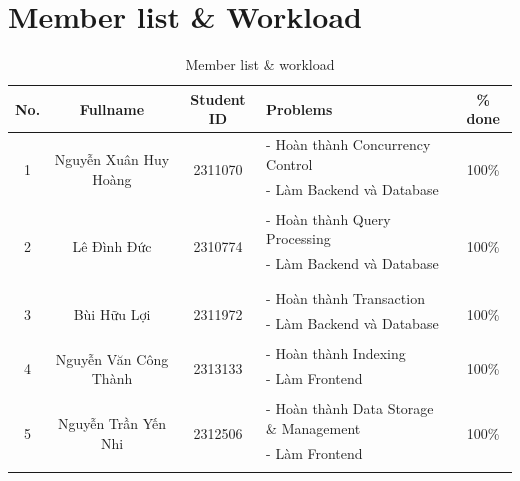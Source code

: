 
\section*{Member list \& Workload}
\begin{center}
\begin{table}[h]
\centering
\begin{tabular}{|c|c|c|p{6cm}|c|}
\hline
\textbf{No.} & \textbf{Fullname} & \textbf{Student ID} & \textbf{Problems} & \textbf{\% done}\\
\hline 
\multirow{3}{*}{1} & \multirow{3}{*}{Nguyễn Xuân Huy Hoàng} & \multirow{3}{*}{2311070} & 
- Hoàn thành Concurrency Control & \multirow{3}{*}{100\%}\\
 & &  & - Làm Backend và Database  &\\
 & &  & &\\
\hline 
\multirow{4}{*}{2} & \multirow{4}{*}{Lê Đình Đức} & \multirow{4}{*}{2310774} & 
- Hoàn thành Query Processing & \multirow{4}{*}{100\%}\\
 & &  & - Làm Backend và Database  &\\
 & &  & &\\
 & &  & &\\
\hline
\multirow{3}{*}{3} & \multirow{3}{*}{Bùi Hữu Lợi} & \multirow{3}{*}{2311972} & 
- Hoàn thành Transaction  & \multirow{3}{*}{100\%}\\
 & &  & - Làm Backend và Database  &\\
 & &  & &\\
\hline
\multirow{3}{*}{4} & \multirow{3}{*}{Nguyễn Văn Công Thành} & \multirow{3}{*}{2313133} & 
- Hoàn thành Indexing & \multirow{3}{*}{100\%}\\
 & &  & - Làm Frontend &\\
 & &  & & \\
\hline
\multirow{3}{*}{5} & \multirow{3}{*}{Nguyễn Trần Yến Nhi} & \multirow{3}{*}{2312506} & 
- Hoàn thành Data Storage \& Management  & \multirow{3}{*}{100\%}\\
 & &  & - Làm Frontend  & \\
 & &  & & \\
\hline
\end{tabular}
\caption{\label{table1}Member list \& workload}
\end{table}
\end{center}

